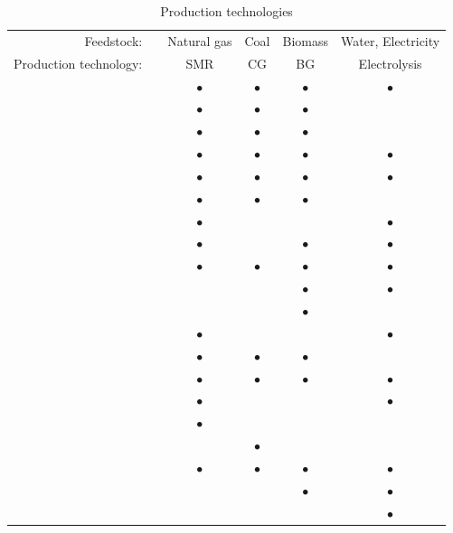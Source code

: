 \documentclass[11pt,3p]{elsarticle}
\begin{document}
\begin{table}[!htbp]
\centering
\caption{Production technologies}
\label{tab:ProdTech}
\begin{tabular}{llcccc}
\hline
\multicolumn{1}{r}{Feedstock:} &  & Natural gas & Coal & Biomass & Water, Electricity \\
\multicolumn{1}{r}{Production technology:} &  & SMR & CG & BG & Electrolysis \\ \hline
\citet{agnolucci2013importance} &  & $\bullet$ & $\bullet$ & $\bullet$ & $\bullet$ \\
\citet{almansoori2016design} &  & $\bullet$ & $\bullet$ & $\bullet$ &  \\
\citet{almansoori2006design} &  & $\bullet$ & $\bullet$ & $\bullet$ &  \\
\citet{almansoori2009design} &  & $\bullet$ & $\bullet$ & $\bullet$ & $\bullet$ \\
\citet{almansoori2012design} &  & $\bullet$ & $\bullet$ & $\bullet$ & $\bullet$ \\
\citet{almaraz2013assessment} &  & $\bullet$ & $\bullet$ & $\bullet$ &  \\
\citet{almaraz2014hydrogen} &  & $\bullet$ &  &  & $\bullet$ \\
\citet{almaraz2015deployment} &  & $\bullet$ &  & $\bullet$ & $\bullet$ \\
\citet{bique2018outlook} &  & $\bullet$ & $\bullet$ & $\bullet$ & $\bullet$ \\
\citet{brey2006designing} &  &  &  & $\bullet$ & $\bullet$ \\
\citet{cho2016optimization} &  &  &  & $\bullet$ &  \\
\citet{dayhim2014planning} &  & $\bullet$ &  &  & $\bullet$ \\
\citet{guillen2010bi} &  & $\bullet$ & $\bullet$ & $\bullet$ &  \\
\citet{han2012modeling} &  & $\bullet$ & $\bullet$ & $\bullet$ & $\bullet$ \\
\citet{han2013multi} &  & $\bullet$ &  &  & $\bullet$ \\
\citet{hwangbo2017mathematical} &  & $\bullet$ &  &  &  \\
\citet{johnson2012spatially} &  &  & $\bullet$ &  &  \\
\citet{kamarudin2009synthesis} &  & $\bullet$ & $\bullet$ & $\bullet$ & $\bullet$ \\
\citet{kim2016optimization} &  &  &  & $\bullet$ & $\bullet$ \\
\citet{kim2017integrated} &  &  &  &  & $\bullet$ \\

\end{tabular}
\end{table}
\end{document}
